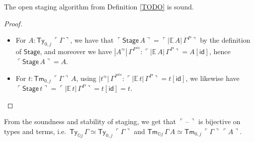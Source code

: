 \documentclass[acmsmall]{acmart}
\newcommand{\msf}[1]{\mathsf{#1}}
\newcommand{\mbb}[1]{\mathbb{#1}}
\newcommand{\mbbo}{\mbb{O}}
\newcommand{\Ty}{\msf{Ty}}
\newcommand{\Tm}{\msf{Tm}}
\newcommand{\id}{\msf{id}}
\newcommand{\blank}{{\mathord{\hspace{1pt}\text{--}\hspace{1pt}}}}
\newcommand{\emb}[1]{\ulcorner#1\urcorner}
\newcommand{\Stage}{\msf{Stage}}
\newcommand{\ev}{\mbb{E}}
\theoremstyle{remark}
\newcommand{\rel}{^{\approx}}
\begin{document}
\begin{theorem} The open staging algorithm from Definition \ref{TODO} is sound.
\end{theorem}
\begin{proof}
\mbox{}
\begin{itemize}
\item For $A : \Ty_{0,j}\,\emb{\Gamma}$, we have that $\emb{\Stage\,A} =
\emb{|\ev\,A|\,\Gamma^P}$ by the definition of $\Stage$, and moreover we have
$|A\rel|\,{\Gamma^P}\rel : \emb{|\ev\,A|\,\Gamma^P} = A[\id]$, hence $\emb{\Stage\,A} = A$.

\item For $t : \Tm_{0,j}\,\emb{\Gamma}\,A$, using $|t\rel|\,{\Gamma^P}\rel : \emb{|\ev\,t|\,\Gamma^P} = t[\id]$, we likewise
  have $\emb{\Stage\,t} = \emb{|\ev\,t|\,\Gamma^P} = t[\id] = t$.
\end{itemize}
\end{proof}

\begin{corollary}
From the soundness and stability of staging, we get that $\emb{\blank}$ is
bijective on types and terms, i.e.\ $\Ty_{\mbbo j}\,\Gamma \simeq \Ty_{0,j}\,\emb{\Gamma}$ and
$\Tm_{\mbbo j}\,\Gamma\,A \simeq \Tm_{0,j}\,\emb{\Gamma}\,\emb{A}$.
\end{corollary}

















\end{document}
